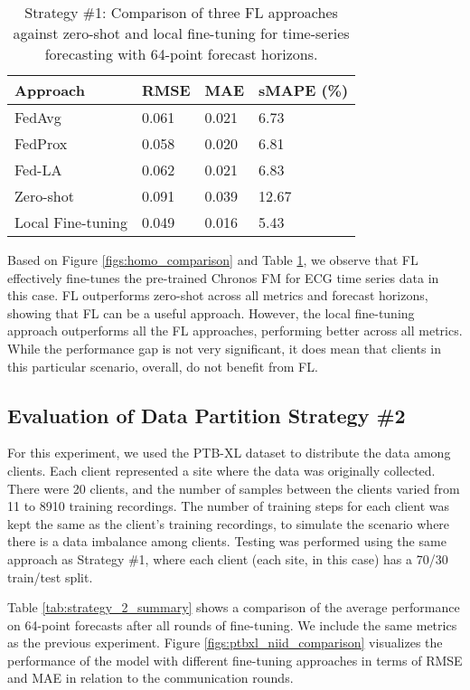\begin{table}
  \caption{{Strategy \#1: Comparison of three FL approaches against zero-shot and local fine-tuning for time-series forecasting with 64-point forecast horizons.}}
  \label{tab:homo_comparison}
  \centering
  \begin{tabular}{l l l l}
    \toprule 
    Approach                   & RMSE      & MAE    & sMAPE (\%)  \\
    \midrule
    FedAvg                  & 0.061    & 0.021   & 6.73       \\
    FedProx                 & 0.058    & 0.020   & 6.81       \\
    Fed-LA                   & 0.062    & 0.021   & 6.83       \\
    Zero-shot               & 0.091    & 0.039   & 12.67      \\
    Local Fine-tuning       & 0.049    & 0.016   & 5.43       \\
    \bottomrule
  \end{tabular}
\end{table}

Based on Figure \ref{figs:homo_comparison} and Table \ref{tab:homo_comparison}, we observe that FL effectively fine-tunes the pre-trained Chronos FM for ECG time series data in this case.
FL outperforms zero-shot across all metrics and forecast horizons, showing that FL can be a useful approach. 
However, the local fine-tuning approach outperforms all the FL approaches, performing better across all metrics. 
While the performance gap is not very significant, it does mean that clients in this particular scenario, overall, do not benefit from FL.

\subsection{Evaluation of Data Partition Strategy \#2}
For this experiment, we used the PTB-XL dataset to distribute the data among clients.
Each client represented a site where the data was originally collected.
There were 20 clients, and the number of samples between the clients varied from 11 to 8910 training recordings. 
The number of training steps for each client was kept the same as the client's training recordings, to simulate the scenario where there is a data imbalance among clients.
Testing was performed using the same approach as Strategy \#1, where each client (each site, in this case) has a 70/30 train/test split.


Table \ref{tab:strategy_2_summary} shows a comparison of the average performance on 64-point forecasts after all rounds of fine-tuning. 
We include the same metrics as the previous experiment. 
Figure \ref{figs:ptbxl_niid_comparison} visualizes the performance of the model with different fine-tuning approaches in terms of RMSE and MAE in relation to the communication rounds. 

